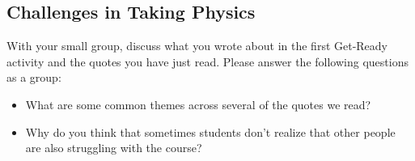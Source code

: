 \documentclass[]{article}
\begin{document}
\begin{PresentSpace}
\section*{Challenges in Taking Physics}
With your small group, discuss what you wrote about in the first Get-Ready activity and the quotes you have just read. Please answer the following questions as a group:
\begin{itemize}
	\item What are some common themes across several of the quotes we read?
	\item Why do you think that sometimes students don’t realize that other people are also struggling with the course?
\end{itemize}
\end{PresentSpace}
\newpage
\begin{TeacherMargin}
\footnotesize
\PortDriveI
\PortDriveASol
\PortDriveII
\PortDriveBSol
\end{TeacherMargin}
\begin{PresentSpace}
\addtocounter{ActNumber}{-1}
\PortDriveI
\PortDriveA
\PortDriveII
\PortDriveB
\end{PresentSpace}
\newpage
\begin{TeacherMargin}
\tiny
\VecRepsI
\VecRepsSol
\end{TeacherMargin}
\begin{PresentSpace}
\addtocounter{ActNumber}{-1}
\VecRepsI
\VecRepsII
\end{PresentSpace}
\newpage
\begin{TeacherMargin}
\GardenVec
\GardenVecISol
\GardenVecII
\GardenVecIISol
\GardenVecIIASol
\GardenVecIIBSol
\GardenVecIICSol
\end{TeacherMargin}
\begin{PresentSpace}
\addtocounter{ActNumber}{-1}
\begin{multicols}{2}
\GardenVec
\GardenVecI
\GardenVecII
\GardenVecIIA
\GardenVecIIB
\GardenVecIIC
\end{multicols}
\end{PresentSpace}
\end{document}
